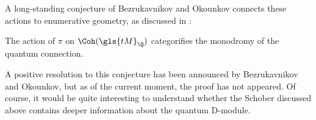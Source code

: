 


A long-standing conjecture of Bezrukavnikov and Okounkov connects these actions to enumerative geometry, as discussed in \cite[\S 3.2]{OkGRT}:
\begin{conjecture}\label{conj:BO}
The action of $\pi$ on $\Coh(\gls{tM} _\Q)$ categorifies the monodromy of the quantum connection.
\end{conjecture}
A positive resolution to this conjecture has been announced by Bezrukavnikov and Okounkov, but as of the current moment, the proof has not appeared.  Of course, it would be quite interesting to understand whether the Schober discussed above contains deeper information about the quantum D-module.  






